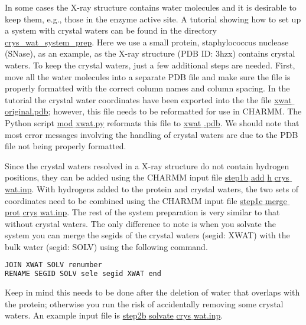 In some cases the X-ray structure contains water molecules and it is desirable to keep them, e.g., those in the enzyme active site.
A tutorial showing how to set up a system with crystal waters can be
found in the directory \href{https://gitlab.com/shenlab-amber-cphmd/cphmd-tutorial/-/tree/main/hphmd_charmm/crys_wat_system_prep}{crys\_wat\_system\_prep}.
Here we use a small protein, staphylococcus nuclease (SNase), as an example,
as the X-ray structure (PDB ID: 3hzx) contains crystal waters.
To keep the crystal waters, just a few additional steps are needed.
First, move all the water molecules into a separate PDB file and make sure the file is properly formatted with the correct column names and column spacing.
In the tutorial the crystal water coordinates have been exported into the the file
\href{https://gitlab.com/shenlab-amber-cphmd/cphmd-tutorial/-/tree/main/hphmd_charmm/crys_wat_system_prep}
{xwat$\_$original.pdb}; however, this file needs to be reformatted for use in CHARMM. 
The Python script
\href{https://gitlab.com/shenlab-amber-cphmd/cphmd-tutorial/-/tree/main/hphmd_charmm/crys_wat_system_prep}
{mod$\_$xwat.py}
reformats this file to
\href{https://gitlab.com/shenlab-amber-cphmd/cphmd-tutorial/-/tree/main/hphmd_charmm/crys_wat_system_prep}
{xwat$\_$.pdb}.
We should note that most error messages involving the handling of crystal waters are due to the PDB file not being properly formatted. 

Since the crystal waters resolved in a X-ray structure do not contain hydrogen positions, they can be added using the CHARMM input file
\href{https://gitlab.com/shenlab-amber-cphmd/cphmd-tutorial/-/tree/main/hphmd_charmm/crys_wat_system_prep}
{step1b$\_$add$\_$h$\_$crys$\_$wat.inp}.
With hydrogens added to the protein and crystal waters, the two sets of coordinates need to be combined using the CHARMM input file
\href{https://gitlab.com/shenlab-amber-cphmd/cphmd-tutorial/-/tree/main/hphmd_charmm/crys_wat_system_prep}
{step1c$\_$merge$\_$prot$\_$crys$\_$wat.inp}.
The rest of the system preparation is very similar to
that without crystal waters.
The only difference to note is when you solvate the system you can merge the segids of the crystal waters (segid: XWAT) with the bulk water (segid: SOLV) using the following command.
%
\begin{lstlisting}[language=bash]
JOIN XWAT SOLV renumber
RENAME SEGID SOLV sele segid XWAT end
\end{lstlisting}
%
Keep in mind this needs to be done after the deletion of water that overlaps with the protein; otherwise you run the risk of accidentally removing some crystal waters.
An example input file is
\href{https://gitlab.com/shenlab-amber-cphmd/cphmd-tutorial/-/tree/main/hphmd_charmm/crys_wat_system_prep}
{step2b$\_$solvate$\_$crys$\_$wat.inp}.


